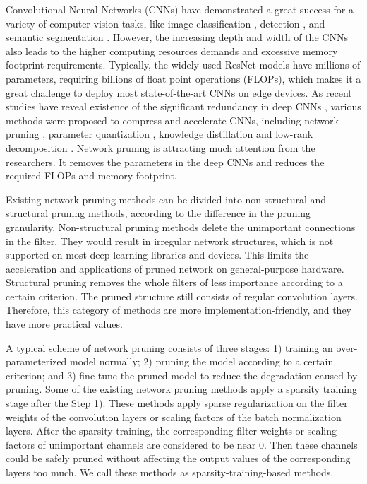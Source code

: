 \documentclass[review]{cvpr}
\begin{document}
Convolutional Neural Networks (CNNs) have demonstrated a great success for a variety of computer vision tasks, like image classification \cite{russakovsky2015imagenet}, detection \cite{lin2014microsoft}, and semantic segmentation \cite{Cordts2016Cityscapes}.  However, the increasing depth and width of the CNNs also leads to the higher computing resources demands and excessive memory footprint requirements. Typically, the widely used ResNet models \cite{he2016deep} have millions of parameters, requiring billions of float point operations (FLOPs), which makes it a great challenge to deploy most state-of-the-art CNNs on edge devices. As recent studies have reveal existence of the significant redundancy in deep CNNs \cite{denil2013predicting}, various methods were proposed to compress and accelerate CNNs, including network pruning \cite{li2020group}, parameter quantization \cite{jacob2018quantization}, knowledge distillation \cite{hinton2015distilling} and low-rank decomposition \cite{denton2014exploiting}. Network pruning is attracting much attention from the researchers. It removes the parameters in the deep CNNs and reduces the required FLOPs and memory footprint.

Existing network pruning methods can be divided into non-structural and structural pruning methods, according to the difference in the pruning granularity. Non-structural pruning methods delete the unimportant connections in the filter. They would result in irregular network structures, which is not supported on most deep learning libraries and devices. This limits the acceleration and applications of pruned network on general-purpose hardware. Structural pruning removes the whole filters of less importance according to a certain criterion. The pruned structure still consists of regular convolution layers. Therefore, this category of methods are more implementation-friendly, and they have more practical values. 

A typical scheme of network pruning consists of three stages: 1) training an over-parameterized model normally; 2) pruning the model according to a certain criterion; and 3) fine-tune the pruned model to reduce the degradation caused by pruning. Some of the existing network pruning methods apply a sparsity training stage after the Step 1). These methods apply sparse regularization on the filter weights of the convolution layers \cite{alvarez2016learning,wen2016learning} or scaling factors \cite{huang2018data,liu2017learning} of the batch normalization layers. After the sparsity training, the corresponding filter weights or scaling factors of unimportant channels are considered to be near 0. Then these channels could be safely pruned without affecting the output values of the corresponding layers too much. We call these methods as sparsity-training-based methods. 
 
\end{document}
